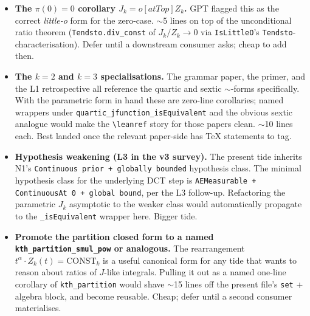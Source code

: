\documentclass[11pt]{article}
\begin{document}
\begin{itemize}[leftmargin=*]

\item \textbf{The $\pi(0) = 0$ corollary $J_k =o[atTop] Z_k$.} GPT
flagged this as the correct \emph{little-o} form for the zero-case.
$\sim$5 lines on top of the unconditional ratio theorem
(\texttt{Tendsto.div\_const} of $J_k/Z_k \to 0$ via \texttt{IsLittleO}'s
\texttt{Tendsto}-characterisation). Defer until a downstream consumer
asks; cheap to add then.

\item \textbf{The $k=2$ and $k=3$ specialisations.} The grammar
paper, the primer, and the L1 retrospective all reference the
quartic and sextic $\sim$-forms specifically. With the parametric
form in hand these are zero-line corollaries; named wrappers under
\texttt{quartic\_jfunction\_isEquivalent} and the obvious sextic
analogue would make the \texttt{\textbackslash leanref} story for those
papers clean. $\sim$10 lines each. Best landed once the relevant
paper-side has TeX statements to tag.

\item \textbf{Hypothesis weakening (L3 in the v3 survey).} The
present tide inherits N1's \texttt{Continuous prior + globally
bounded} hypothesis class. The minimal hypothesis class for the
underlying DCT step is
\texttt{AEMeasurable + ContinuousAt 0 + global bound}, per the L3
follow-up. Refactoring the parametric $J_k$ asymptotic to the weaker
class would automatically propagate to the
\texttt{\_isEquivalent} wrapper here. Bigger tide.

\item \textbf{Promote the partition closed form to a named
\texttt{kth\_partition\_smul\_pow} or analogous.} The rearrangement
$t^\alpha \cdot Z_k(t) = \mathrm{CONST}_k$ is a useful canonical form
for any tide that wants to reason about ratios of $J$-like
integrals. Pulling it out as a named one-line corollary of
\texttt{kth\_partition} would shave $\sim$15 lines off the present
file's \texttt{set} + algebra block, and become reusable. Cheap;
defer until a second consumer materialises.

\end{itemize}
\end{document}
